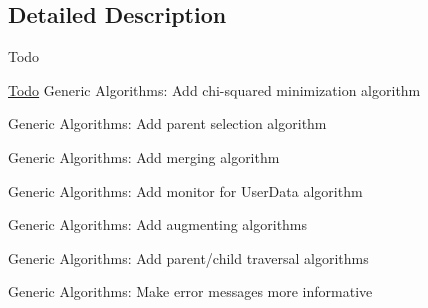 \subsection{Detailed Description}
\begin{DoxyRefDesc}{Todo}
\item[\hyperlink{todo__todo000001}{Todo}]Generic Algorithms\+: Add chi-\/squared minimization algorithm 

Generic Algorithms\+: Add parent selection algorithm 

Generic Algorithms\+: Add merging algorithm 

Generic Algorithms\+: Add monitor for User\+Data algorithm 

Generic Algorithms\+: Add augmenting algorithms 

Generic Algorithms\+: Add parent/child traversal algorithms 

Generic Algorithms\+: Make error messages more informative \end{DoxyRefDesc}


